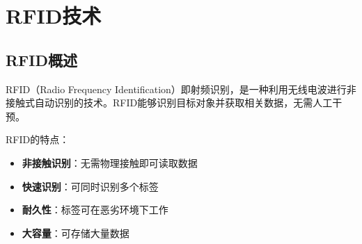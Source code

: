 
\chapter{RFID技术}
\label{chap:rfid_technology}

\section{RFID概述}
\label{sec:rfid_intro}

RFID（Radio Frequency Identification）即射频识别，是一种利用无线电波进行非接触式自动识别的技术。RFID能够识别目标对象并获取相关数据，无需人工干预。

RFID的特点：
\begin{itemize}
    \item \textbf{非接触识别}：无需物理接触即可读取数据
    \item \textbf{快速识别}：可同时识别多个标签
    \item \textbf{耐久性}：标签可在恶劣环境下工作
    \item \textbf{大容量}：可存储大量数据
\end{itemize}

